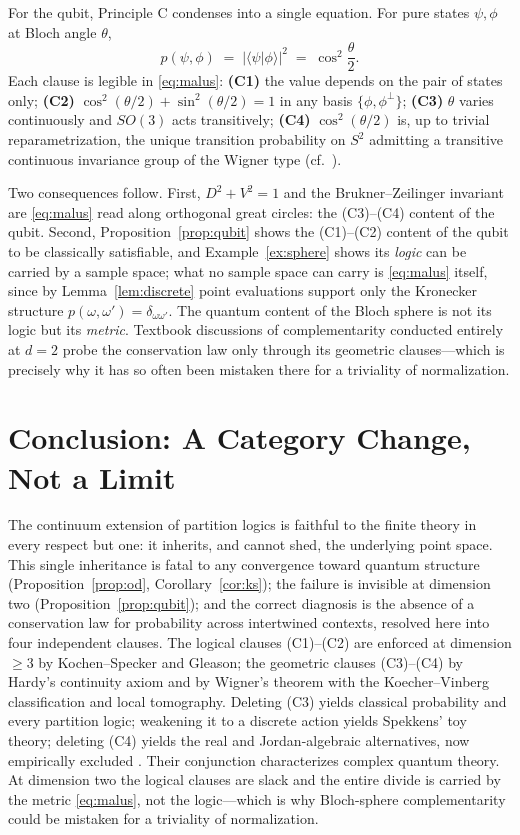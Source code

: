 \documentclass[11pt]{article}
\theoremstyle{definition}
\theoremstyle{remark}
\begin{document}
For the qubit, Principle C condenses into a single equation. For pure
states $\psi,\phi$ at Bloch angle $\theta$,
\begin{equation}\label{eq:malus}
p(\psi,\phi)\;=\;\bigl|\langle\psi|\phi\rangle\bigr|^{2}
\;=\;\cos^{2}\!\frac{\theta}{2}.
\end{equation}
Each clause is legible in \eqref{eq:malus}: \textbf{(C1)} the value
depends on the pair of states only; \textbf{(C2)}
$\cos^{2}(\theta/2)+\sin^{2}(\theta/2)=1$ in any basis
$\{\phi,\phi^{\perp}\}$; \textbf{(C3)} $\theta$ varies continuously and
$SO(3)$ acts transitively; \textbf{(C4)} $\cos^{2}(\theta/2)$ is, up to
trivial reparametrization, the unique transition probability on $S^{2}$
admitting a transitive continuous invariance group of the Wigner type
(cf.\ \cite{BruknerZeilingerMalus}).

Two consequences follow. First, $D^{2}+V^{2}=1$ and the
Brukner--Zeilinger invariant are \eqref{eq:malus} read along orthogonal
great circles: the (C3)--(C4) content of the qubit. Second,
Proposition~\ref{prop:qubit} shows the (C1)--(C2) content of the qubit
to be classically satisfiable, and Example~\ref{ex:sphere} shows its
\emph{logic} can be carried by a sample space; what no sample space can
carry is \eqref{eq:malus} itself, since by Lemma~\ref{lem:discrete}
point evaluations support only the Kronecker structure
$p(\omega,\omega')=\delta_{\omega\omega'}$. The quantum content of the
Bloch sphere is not its logic but its \emph{metric}. Textbook
discussions of complementarity conducted entirely at $d=2$ probe the
conservation law only through its geometric clauses---which is precisely
why it has so often been mistaken there for a triviality of
normalization.

\section{Conclusion: A Category Change, Not a Limit}

The continuum extension of partition logics is faithful to the finite
theory in every respect but one: it inherits, and cannot shed, the
underlying point space. This single inheritance is fatal to any
convergence toward quantum structure (Proposition~\ref{prop:od},
Corollary~\ref{cor:ks}); the failure is invisible at dimension two
(Proposition~\ref{prop:qubit}); and the correct diagnosis is the absence
of a conservation law for probability across intertwined contexts,
resolved here into four independent clauses. The logical clauses
(C1)--(C2) are enforced at dimension $\geq3$ by Kochen--Specker and
Gleason; the geometric clauses (C3)--(C4) by Hardy's continuity axiom
and by Wigner's theorem with the Koecher--Vinberg classification and
local tomography. Deleting (C3) yields classical probability and every
partition logic; weakening it to a discrete action yields Spekkens'
toy theory; deleting (C4) yields the real and Jordan-algebraic
alternatives, now empirically excluded \cite{Renou2021}. Their
conjunction characterizes complex quantum theory. At dimension two the
logical clauses are slack and the entire divide is carried by the
metric \eqref{eq:malus}, not the logic---which is why Bloch-sphere
complementarity could be mistaken for a triviality of normalization.
\end{document}
